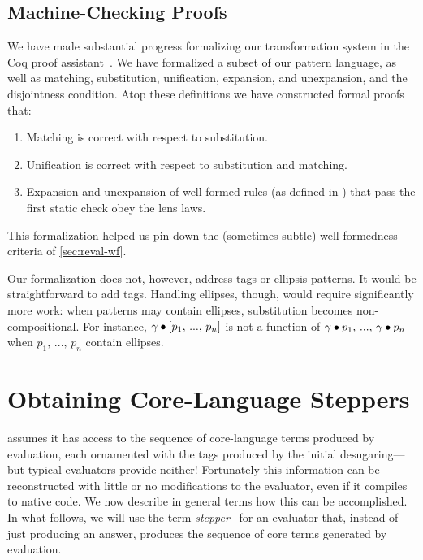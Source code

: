 \subsection{Machine-Checking Proofs}
\label{sec:reval-coq}

We have made substantial progress formalizing our transformation system in
the Coq proof assistant~\cite{coq-manual}. We have formalized a subset of
our pattern language, as well as matching, substitution, unification,
expansion, and unexpansion, and the disjointness condition. Atop these
definitions we have constructed formal proofs that:
\begin{enumerate}
\item Matching is correct with respect to substitution.
\item Unification is correct with respect to substitution and matching.
\item Expansion and unexpansion of well-formed rules (as defined in
  ) that pass the first static check obey the
  lens laws.
\end{enumerate}
This formalization helped us pin down the (sometimes subtle)
well-formedness criteria of \cref{sec:reval-wf}.

Our formalization does not, however, address tags or ellipsis patterns.
It would be straightforward to add tags. Handling ellipses, though, would
require significantly more work: when patterns may contain ellipses,
substitution becomes non-compositional. For instance, $\gamma \bullet
[p_1,\,...,\,p_n]$ is not a function of $\gamma \bullet p_1,\,...,\,\gamma \bullet p_n$
when $p_1,\,...,\,p_n$ contain ellipses.



\section{Obtaining Core-Language Steppers}
\label{sec:reval-lang}


{\Resugarer} assumes it has access to the sequence of core-language terms
produced by evaluation, each ornamented with the tags produced by the
initial desugaring---but typical evaluators provide neither!
Fortunately this information can be reconstructed with little or no
modifications to the evaluator, even if it compiles to native code. We now
describe in general terms how this can be accomplished.  In what follows,
we will use the term \emph{stepper}~\cite{racket-stepper} for an
evaluator that, instead of just producing an answer, produces
the sequence of core terms generated by evaluation.

